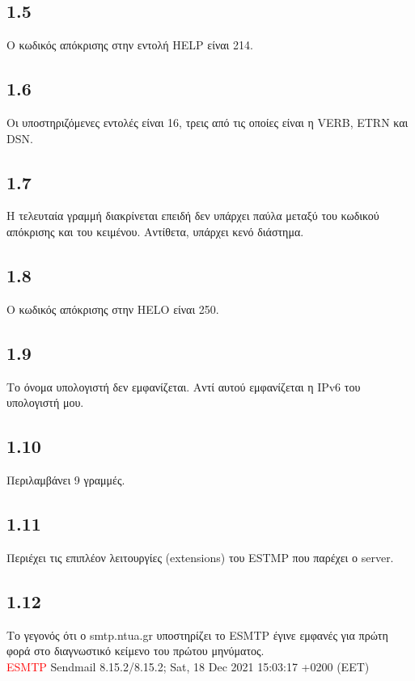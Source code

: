 		\subsection*{1.5} 
			Ο κωδικός απόκρισης στην εντολή HELP είναι 214.

		\subsection*{1.6} 
			Οι υποστηριζόμενες εντολές είναι 16, τρεις από τις οποίες είναι η VERB, ETRN και DSN.

		\subsection*{1.7} 
			Η τελευταία γραμμή διακρίνεται επειδή δεν υπάρχει παύλα μεταξύ του κωδικού απόκρισης και του κειμένου.  Αντίθετα, υπάρχει κενό διάστημα.

		\subsection*{1.8} 
			Ο κωδικός απόκρισης στην HELO είναι 250.

		\subsection*{1.9} 
			Το όνομα υπολογιστή δεν εμφανίζεται. Αντί αυτού εμφανίζεται η IPv6 του υπολογιστή μου.

		\subsection*{1.10} 
			Περιλαμβάνει 9 γραμμές.

		\subsection*{1.11} 
			Περιέχει τις επιπλέον λειτουργίες (extensions) του ESTMP που παρέχει ο server. 

		\subsection*{1.12} 
			Το γεγονός ότι ο smtp.ntua.gr υποστηρίζει το ESMTP έγινε εμφανές για πρώτη φορά στο διαγνωστικό κείμενο του πρώτου μηνύματος. \\
			
			\textcolor{red}{ESMTP} Sendmail 8.15.2/8.15.2; Sat, 18 Dec 2021 15:03:17 +0200 (EET)

